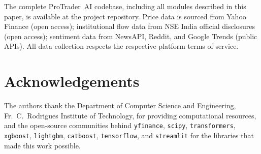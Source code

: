 \documentclass[ASNA,twocolumn]{USG}
\begin{document}
The complete ProTrader~AI codebase, including all modules described in this
paper, is available at the project repository.
Price data is sourced from Yahoo Finance (open access);
institutional flow data from NSE India official disclosures (open access);
sentiment data from NewsAPI, Reddit, and Google Trends (public APIs).
All data collection respects the respective platform terms of service.

\section*{Acknowledgements}

The authors thank the Department of Computer Science and Engineering,
Fr.~C.~Rodrigues Institute of Technology, for providing computational
resources, and the open-source communities behind \texttt{yfinance},
\texttt{scipy}, \texttt{transformers}, \texttt{xgboost}, \texttt{lightgbm},
\texttt{catboost}, \texttt{tensorflow}, and \texttt{streamlit} for the
libraries that made this work possible.



\end{document}
